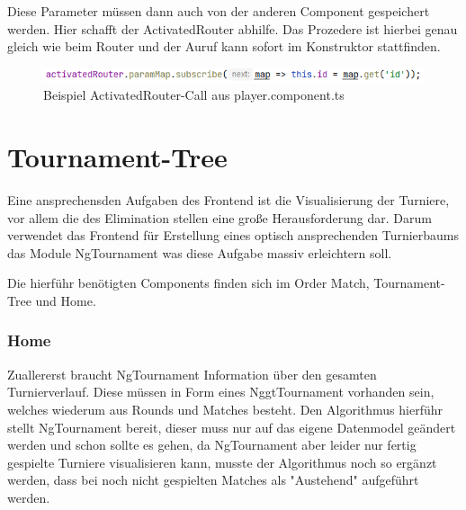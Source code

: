 Diese Parameter müssen dann auch von der anderen Component gespeichert werden. Hier schafft der ActivatedRouter abhilfe. Das Prozedere ist hierbei genau gleich wie beim Router und der Auruf kann sofort im Konstruktor stattfinden.

\begin{figure}[H]
    \includegraphics[scale=1]{pics/frontend/example_activatedRouter.PNG}
    \caption{Beispiel ActivatedRouter-Call aus player.component.ts}
\end{figure}

\section{Tournament-Tree}

Eine ansprechensden Aufgaben des Frontend ist die Visualisierung der Turniere, vor allem die des Elimination stellen eine große Herausforderung dar. Darum verwendet das Frontend für Erstellung eines optisch ansprechenden Turnierbaums das Module NgTournament was diese Aufgabe massiv erleichtern soll. \cite{implementation-angular-6}

Die hierführ benötigten Components finden sich im Order Match, Tournament-Tree und Home.

\subsubsection{Home}
Zuallererst braucht NgTournament Information über den gesamten Turnierverlauf. Diese müssen in Form eines NggtTournament vorhanden sein, welches wiederum aus Rounds und Matches besteht. Den Algorithmus hierführ stellt NgTournament bereit, dieser muss nur auf das eigene Datenmodel geändert werden und schon sollte es gehen,
da NgTournament aber leider nur fertig gespielte Turniere visualisieren kann, musste der Algorithmus noch so ergänzt werden, dass bei noch nicht gespielten Matches als "Austehend" aufgeführt werden. 


